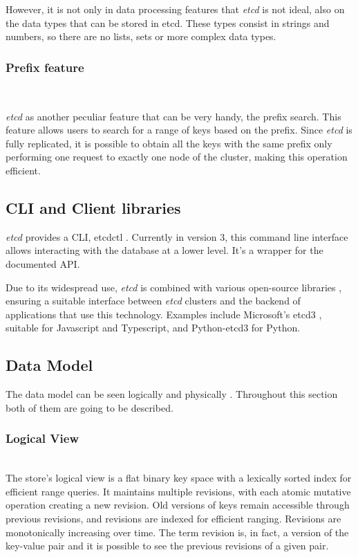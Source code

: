 \documentclass[screen,review]{acmart}
\begin{document}
However, it is not only in data processing features that \textit{etcd} is not ideal, also on the data types that can be stored in etcd. These types consist in strings and numbers, so there are no lists, sets or more complex data types. \\

\subsubsection{Prefix feature}~\

\textit{etcd} as another peculiar feature that can be very handy, the prefix search. This feature allows users to search for a range of keys based on the prefix. Since \textit{etcd} is fully replicated, it is possible to obtain all the keys with the same prefix only performing one request to exactly one node of the cluster, making this operation efficient.

\subsection{CLI and Client libraries}

\textit{etcd} provides a CLI, etcdctl \cite{etcd_clt}. Currently in version 3, this command line interface allows interacting with the database at a lower level. It's a wrapper for the documented API.

Due to its widespread use, \textit{etcd} is combined with various open-source libraries \cite{etcd_library}, ensuring a suitable interface between \textit{etcd} clusters and the backend of applications that use this technology. Examples include Microsoft's etcd3 \cite{etcd_microsoft}, suitable for Javascript and Typescript, and Python-etcd3 \cite{etcd_python} for Python.

\subsection{Data Model}
The data model can be seen logically and physically \cite{etcd_data_model}. Throughout this section both of them are going to be described. \\

\subsubsection{Logical View}~\\
The store's logical view is a flat binary key space with a lexically sorted index for efficient range queries. It maintains multiple revisions, with each atomic mutative operation creating a new revision. Old versions of keys remain accessible through previous revisions, and revisions are indexed for efficient ranging. Revisions are monotonically increasing over time. The term revision is, in fact, a version of the key-value pair and it is possible to see the previous revisions of a given pair.
\end{document}
